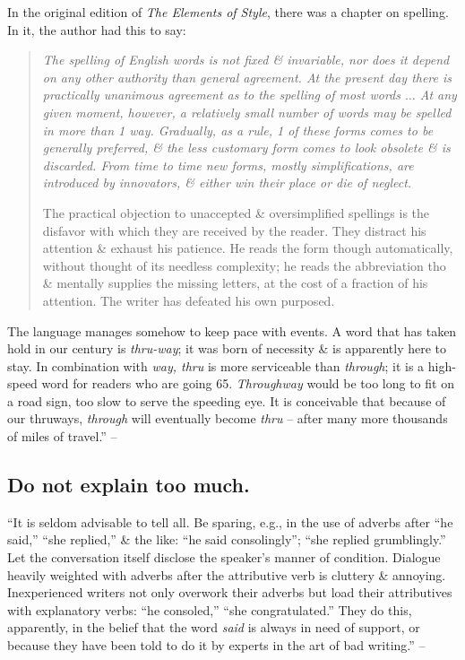 \documentclass{article}
\numberwithin{equation}{section}
\begin{document}
In the original edition of \textit{The Elements of Style}, there was a chapter on spelling. In it, the author had this to say:
\begin{quotation}\it
	The spelling of English words is not fixed \& invariable, nor does it depend on any other authority than general agreement. At the present day there is practically unanimous agreement as to the spelling of most words $\ldots$ At any given moment, however, a relatively small number of words may be spelled in more than 1 way. Gradually, as a rule, 1 of these forms comes to be generally preferred, \& the less customary form comes to look obsolete \& is discarded. From time to time new forms, mostly simplifications, are introduced by innovators, \& either win their place or die of neglect.
	
	The practical objection to unaccepted \& oversimplified spellings is the disfavor with which they are received by the reader. They distract his attention \& exhaust his patience. He reads the form though automatically, without thought of its needless complexity; he reads the abbreviation tho \& mentally supplies the missing letters, at the cost of a fraction of his attention. The writer has defeated his own purposed.
\end{quotation}
The language manages somehow to keep pace with events. A word that has taken hold in our century is \textit{thru-way}; it was born of necessity \& is apparently here to stay. In combination with \textit{way, thru} is more serviceable than \textit{through}; it is a high-speed word for readers who are going 65. \textit{Throughway} would be too long to fit on a road sign, too slow to serve the speeding eye. It is conceivable that because of our thruways, \textit{through} will eventually become \textit{thru} -- after many more thousands of miles of travel.'' -- \cite[p. 88]{Strunk_White2019}


\subsection{Do not explain too much.}
``It is seldom advisable to tell all. Be sparing, e.g., in the use of adverbs after ``he said,'' ``she replied,'' \& the like: ``he said consolingly''; ``she replied grumblingly.'' Let the conversation itself disclose the speaker's manner of condition. Dialogue heavily weighted with adverbs after the attributive verb is cluttery \& annoying. Inexperienced writers not only overwork their adverbs but load their attributives with explanatory verbs: ``he consoled,'' ``she congratulated.'' They do this, apparently, in the belief that the word \textit{said} is always in need of support, or because they have been told to do it by experts in the art of bad writing.'' -- \cite[p. 89]{Strunk_White2019}
\end{document}

